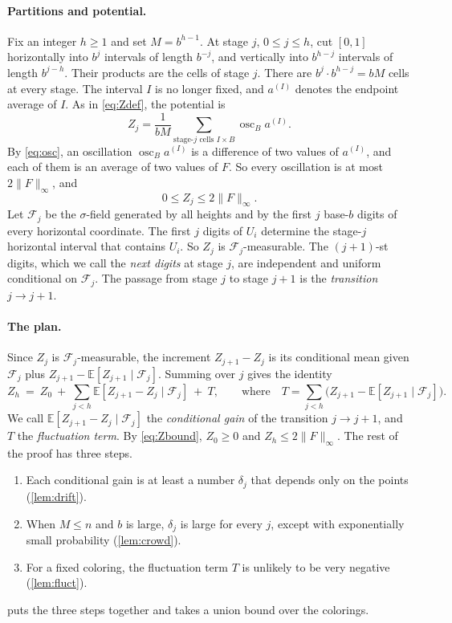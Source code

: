 \documentclass[11pt,letterpaper]{article}
\newcommand{\E}{\mathbb{E}}
\newcommand{\F}{\mathcal{F}}
\newcommand{\1}{\mathbf{1}}
\newcommand{\Fnorm}[1]{\lVert #1\rVert_\infty}
\newcommand{\osc}{\operatorname{osc}}
\begin{document}
\paragraph{Partitions and potential.}
Fix an integer $h\ge1$ and set $M=b^{h-1}$. At stage $j$, $0\le j\le h$, cut $[0,1]$ horizontally into $b^j$ intervals of length $b^{-j}$, and vertically into $b^{h-j}$ intervals of length $b^{j-h}$. Their products are the cells of stage $j$. There are $b^j\cdot b^{h-j}=bM$ cells at every stage. The interval $I$ is no longer fixed, and $a^{(I)}$ denotes the endpoint average of $I$. As in \eqref{eq:Zdef}, the potential is
\[
Z_j=\frac1{bM}\sum_{\text{stage-$j$ cells }I\times B}\osc_Ba^{(I)}.
\]
By \eqref{eq:osc}, an oscillation $\osc_Ba^{(I)}$ is a difference of two values of $a^{(I)}$, and each of them is an average of two values of $F$. So every oscillation is at most $2\Fnorm F$, and
\begin{equation}\label{eq:Zbound}
0\le Z_j\le2\Fnorm F.
\end{equation}
Let $\F_j$ be the $\sigma$-field generated by all heights and by the first $j$ base-$b$ digits of every horizontal coordinate. The first $j$ digits of $U_i$ determine the stage-$j$ horizontal interval that contains $U_i$. So $Z_j$ is $\F_j$-measurable. The $(j+1)$-st digits, which we call the \emph{next digits} at stage $j$, are independent and uniform conditional on $\F_j$. The passage from stage $j$ to stage $j+1$ is the \emph{transition} $j\to j+1$.

\paragraph{The plan.}
Since $Z_j$ is $\F_j$-measurable, the increment $Z_{j+1}-Z_j$ is its conditional mean given $\F_j$ plus $Z_{j+1}-\E[Z_{j+1}\mid\F_j]$. Summing over $j$ gives the identity
\begin{equation}\label{eq:roadmap}
Z_h\ =\ Z_0\ +\ \sum_{j<h}\E[Z_{j+1}-Z_j\mid\F_j]\ +\ T,\qquad\text{where}\quad T=\sum_{j<h}\bigl(Z_{j+1}-\E[Z_{j+1}\mid\F_j]\bigr).
\end{equation}
We call $\E[Z_{j+1}-Z_j\mid\F_j]$ the \emph{conditional gain} of the transition $j\to j+1$, and $T$ the \emph{fluctuation term}. By \eqref{eq:Zbound}, $Z_0\ge0$ and $Z_h\le2\Fnorm F$. The rest of the proof has three steps.
\begin{enumerate}[label=(\alph*),nosep]
\item Each conditional gain is at least a number $\delta_j$ that depends only on the points (\cref{lem:drift}).
\item When $M\le n$ and $b$ is large, $\delta_j$ is large for every $j$, except with exponentially small probability (\cref{lem:crowd}).
\item For a fixed coloring, the fluctuation term $T$ is unlikely to be very negative (\cref{lem:fluct}).
\end{enumerate}
 puts the three steps together and takes a union bound over the colorings.
\end{document}
